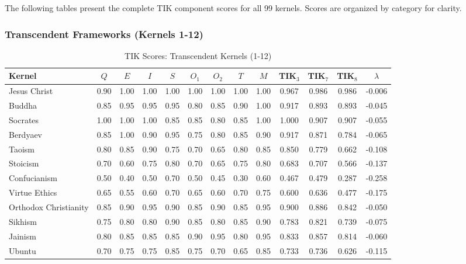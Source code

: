 \documentclass[11pt,a4paper]{article}
\theoremstyle{definition}
\theoremstyle{remark}
\begin{document}
The following tables present the complete TIK component scores for all 99 kernels. Scores are organized by category for clarity.

\subsubsection{Transcendent Frameworks (Kernels 1-12)}

\begin{table}[H]
\centering
\caption{TIK Scores: Transcendent Kernels (1-12)}
\label{tab:tik-transcendent}
\small
\begin{tabular}{@{}l|ccccccc|c|cccc@{}}
\toprule
\textbf{Kernel} & $Q$ & $E$ & $I$ & $S$ & $O_1$ & $O_2$ & $T$ & $M$ & \textbf{TIK$_3$} & \textbf{TIK$_7$} & \textbf{TIK$_8$} & $\lambda$ \\
\midrule
Jesus Christ & 0.90 & 1.00 & 1.00 & 1.00 & 1.00 & 1.00 & 1.00 & 1.00 & 0.967 & 0.986 & 0.986 & -0.006 \\
Buddha & 0.85 & 0.95 & 0.95 & 0.95 & 0.80 & 0.85 & 0.90 & 1.00 & 0.917 & 0.893 & 0.893 & -0.045 \\
Socrates & 1.00 & 1.00 & 1.00 & 0.85 & 0.85 & 0.80 & 0.85 & 1.00 & 1.000 & 0.907 & 0.907 & -0.055 \\
Berdyaev & 0.85 & 1.00 & 0.90 & 0.95 & 0.75 & 0.80 & 0.85 & 0.90 & 0.917 & 0.871 & 0.784 & -0.065 \\
Taoism & 0.80 & 0.85 & 0.90 & 0.75 & 0.70 & 0.65 & 0.80 & 0.85 & 0.850 & 0.779 & 0.662 & -0.108 \\
Stoicism & 0.70 & 0.60 & 0.75 & 0.80 & 0.70 & 0.65 & 0.75 & 0.80 & 0.683 & 0.707 & 0.566 & -0.137 \\
Confucianism & 0.50 & 0.40 & 0.50 & 0.70 & 0.50 & 0.45 & 0.30 & 0.60 & 0.467 & 0.479 & 0.287 & -0.258 \\
Virtue Ethics & 0.65 & 0.55 & 0.60 & 0.70 & 0.65 & 0.60 & 0.70 & 0.75 & 0.600 & 0.636 & 0.477 & -0.175 \\
Orthodox Christianity & 0.85 & 0.90 & 0.95 & 0.90 & 0.85 & 0.90 & 0.85 & 0.95 & 0.900 & 0.886 & 0.842 & -0.050 \\
Sikhism & 0.75 & 0.80 & 0.80 & 0.90 & 0.85 & 0.80 & 0.85 & 0.90 & 0.783 & 0.821 & 0.739 & -0.075 \\
Jainism & 0.80 & 0.85 & 0.85 & 0.85 & 0.90 & 0.95 & 0.80 & 0.95 & 0.833 & 0.857 & 0.814 & -0.060 \\
Ubuntu & 0.70 & 0.75 & 0.75 & 0.85 & 0.75 & 0.70 & 0.65 & 0.85 & 0.733 & 0.736 & 0.626 & -0.115 \\
\bottomrule
\end{tabular}
\end{table}
\end{document}
